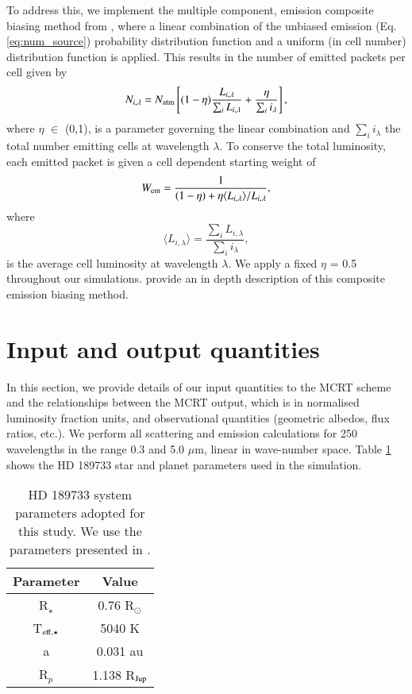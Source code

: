 \documentclass{aa}
\begin{document}
To address this, we implement the multiple component, emission composite biasing method from \citet{Baes2016}, where a linear combination of the unbiased emission (Eq. \ref{eq:num_source}) probability distribution function and a uniform (in cell number) distribution function is applied.
This results in the number of emitted packets per cell given by
\begin{equation}
\label{eq:num_bias}
N_{i, \lambda} = N_{\rm atm} \left[(1 - \eta)\frac{L_{i, \lambda}}{\sum_{i} L_{i, \lambda}} + \frac{\eta}{\sum_{i} i_{\lambda}}\right],
\end{equation}
where $\eta$ $\in$ (0,1), is a parameter governing the linear combination and $\sum_{i} i_{\lambda}$ the total number emitting cells at wavelength $\lambda$.
To conserve the total luminosity, each emitted packet is given a cell dependent starting weight of 
\begin{equation}
W_{\rm em} = \frac{1}{(1 - \eta) + \eta\langle L_{i, \lambda} \rangle / L_{i, \lambda} },
\end{equation}
where 
\begin{equation}
\langle L_{i, \lambda} \rangle  = \frac{{\sum_{i} L_{i, \lambda}}}{\sum_{i} i_{\lambda}},
\end{equation}
is the average cell luminosity at wavelength $\lambda$.
We apply a fixed $\eta$ = 0.5 throughout our simulations.
\citet{Baes2016} provide an in depth description of this composite emission biasing method.

\section{Input and output quantities}
\label{sec:Method}

In this section, we provide details of our input quantities to the MCRT scheme and the relationships between the MCRT output, which is in normalised luminosity fraction units, and observational quantities (geometric albedos, flux ratios, etc.).
We perform all scattering and emission calculations for 250 wavelengths in the range 0.3 and 5.0 $\mu$m, linear in wave-number space.
Table \ref{tab:sys_prop} shows the HD 189733 star and planet parameters used in the simulation.

\begin{table}[htdp]
\caption{HD 189733 system parameters adopted for this study. We use the parameters presented in \citet{Torres2008}.}
\begin{center}
\begin{tabular}{|c|c|}
Parameter & Value \\ \hline
R$_{\star}$ & 0.76 R$_{\odot}$ \\
T$_{\rm eff, \star}$ & 5040 K \\
a & 0.031 au \\
R$_{p}$ & 1.138 R$_{\rm Jup}$ \\
\end{tabular}
\end{center}
\label{tab:sys_prop}
\end{table}%
\end{document}

